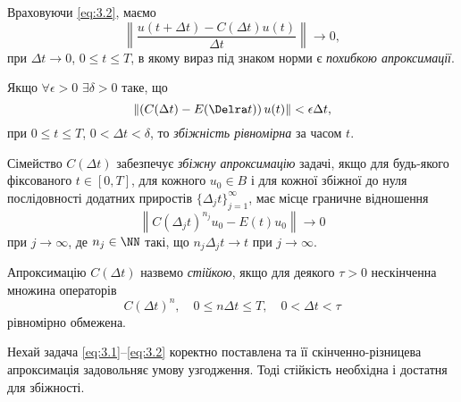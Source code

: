 \begin{definition}
    Враховуючи \eqref{eq:3.2}, маємо
    \begin{equation}
        \label{eq:3.6b}
        \left\| \frac{u(t + \Delta t) - C(\Delta t) u(t)}{\Delta t} \right\| \to 0,
    \end{equation}
    при $\Delta t \to 0$, $0 \le t \le T$, в якому вираз під знаком норми є \textit{похибкою апроксимації}.
\end{definition}

Якщо $\forall \epsilon > 0$ $\exists \delta > 0$ таке, що 
\begin{equation}
    \label{eq:3.6c}
    \left\| \left( C(\Delta t) - E(\Delra t) \right) u(t) \right\| < \epsilon \Delta t,
\end{equation}
при $0 \le t \le T$, $0 < \Delta t < \delta$, то \textit{збіжність рівномірна} за часом $t$. \medskip

\begin{definition}
    Сімейство $C(\Delta t)$ забезпечує \textit{збіжну апроксимацію} задачі, якщо для будь-якого фіксованого $t \in [0, T]$, для кожного $u_0 \in B$ і для кожної збіжної до нуля послідовності додатних приростів $\{\Delta_j t\}_{j = 1}^\infty$, має місце граничне відношення 
    \begin{equation}
        \label{eq:3.7}
        \left\| C(\Delta_j t)^{n_j} u_0 - E(t) u_0 \right\| \to 0
    \end{equation}
    при $j \to \infty$, де $n_j \in \NN$ такі, що $n_j \Delta_j t \to t$ при $j \to \infty$.
\end{definition}

\begin{definition}
    Апроксимацію $C(\Delta t)$ назвемо \textit{стійкою}, якщо для деякого $\tau > 0$ нескінченна множина операторів 
    \begin{equation}
        \label{eq:3.9}
        C(\Delta t)^n, \quad 0 \le n \Delta t \le T, \quad 0 < \Delta t < \tau
    \end{equation}
    рівномірно обмежена. 
\end{definition}

\begin{theorem}
    Нехай задача \eqref{eq:3.1}--\eqref{eq:3.2} коректно поставлена та її скінченно-різницева апроксимація задовольняє умову узгодження. Тоді стійкість необхідна і достатня для збіжності.
\end{theorem}

